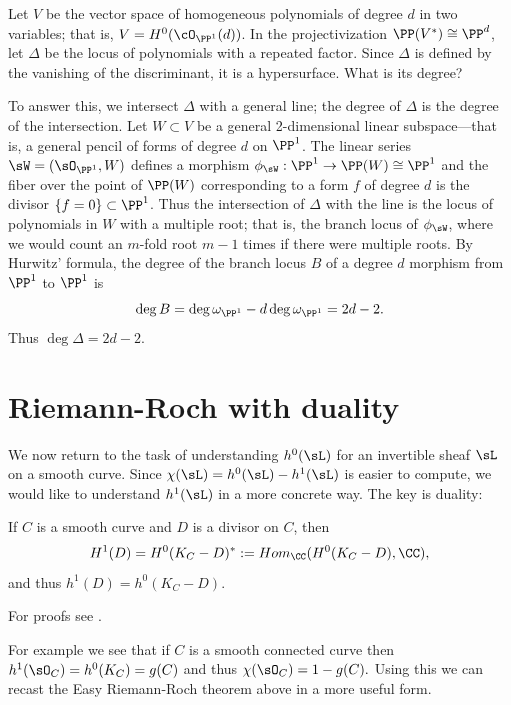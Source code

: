 \begin{example}
 Let $V$ be the vector space of homogeneous polynomials of degree $d$ in two variables; that is, $V = H^0(\cO_{\PP^1}(d))$. In the projectivization $\PP(V^{*}) \cong \PP^d$, let $\Delta$ be the locus of polynomials with a repeated factor. Since $\Delta$ is defined by the vanishing of the discriminant, it is a hypersurface. What is its degree?
 
 To answer this, we intersect $\Delta$ with a general line; the degree of $\Delta$ is the degree of the intersection.  Let $W\subset V$ be a general 2-dimensional linear subspace---that is, a general pencil of forms of degree $d$ on $\PP^1$. The linear series $\sW = (\sO_{\PP^{1}}, W)$ defines a morphism $\phi_{\sW} : \PP^{1} \to \PP(W) \cong \PP^{1}$ and the fiber over the point of $\PP(W)$ corresponding to a form $f$ of degree $d$ is the divisor $\{f = 0\}\subset \PP^{1}$. Thus the intersection of $\Delta$ with the line is the locus of polynomials in $W$ with a multiple root; that is, the branch locus of $\phi_{\sW}$, where we would count an $m$-fold root $m-1$ times if there were multiple roots.
 By Hurwitz' formula, the degree of the branch locus $B$ of a degree $d$ morphism from $\PP^{1}$ to $\PP^{1}$ is
 $$
 \deg B = \deg \omega_{\PP^{1}} - d\deg \omega_{\PP^{1}} = 2d-2.
 $$
 Thus $\deg \Delta = 2d-2$.
 \end{example}
  

\section{Riemann-Roch with duality}

We now return to the task of understanding $h^0(\sL)$ for an invertible sheaf $\sL$ on a smooth curve. Since $\chi(\sL) = h^0(\sL)-h^1(\sL)$ is easier to compute, we would like to understand $h^1(\sL)$ in a more concrete way. The key is duality:
 
\begin{theorem}\label{sd}
If $C$ is a smooth curve and $D$ is a divisor on $C$, then
$$
H^1(D) =H^0(K_C-D)^* := Hom_\CC(H^0(K_C-D), \CC),
$$
and thus $h^1(D) = h^0(K_C-D)$.
\end{theorem}

For proofs see \cite[Theorem III.5.2 and III.7.6]{Hartshorne1977}. 

For example we see that if $C$ is a smooth connected curve then $h^1 (\sO_C) = h^0(K_C) = g(C)$ and thus $\chi(\sO_C) = 1-g(C).$   
Using this we can recast the Easy Riemann-Roch theorem above in a more useful form. 

